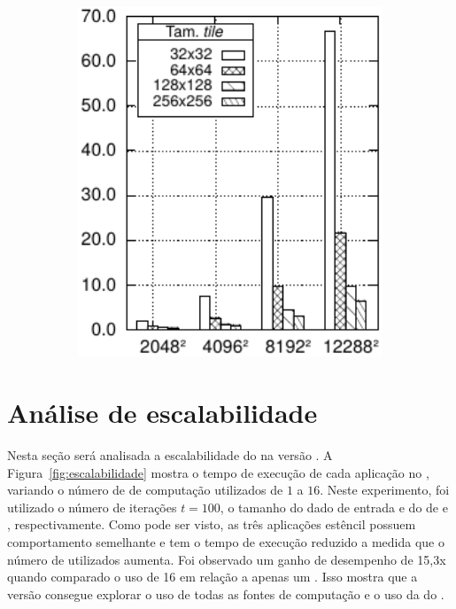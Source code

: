 \begin{figure}
\begin{subfigure}{0.3\textwidth}
    \caption{\gol}
    \label{fig:tilesGol}
  \end{subfigure}
  \begin{subfigure}{0.3\textwidth}
    \centering
    \includegraphics[width=1\textwidth]{figs/MPPAPlotAPIjacobiTimeTiles.pdf}
    \caption{\jacobi}
    \label{fig:tilesJacobi}
  \end{subfigure}
  \label{fig:tiles}
\end{figure}


\section{Análise de escalabilidade}
\label{sec:analise_escalabilidade}

Nesta seção será analisada a escalabilidade do \pskelmppa na versão \async. A Figura~\ref{fig:escalabilidade} mostra o tempo de execução de cada aplicação no \mppa, variando o número de \clusters de computação utilizados de $1$ a $16$. Neste experimento, foi utilizado o número de iterações $t=100$, o tamanho do dado de entrada e do \tile de \ind e \tiled, respectivamente. Como pode ser visto, as três aplicações estêncil possuem comportamento semelhante e tem o tempo de execução reduzido a medida que o número de \clusters utilizados aumenta. Foi observado um ganho de desempenho de 15,3x quando comparado o uso de 16 \clusters em relação a apenas um \cluster. Isso mostra que a versão \pskelmppa \async consegue explorar o uso de todas as fontes de computação e o uso da \noc do \mppa.

